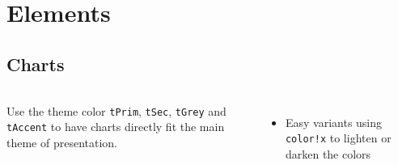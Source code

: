 \documentclass[aspectratio=169]{beamer}
\begin{document}
\section{Elements}
\subsection{Charts}
\begin{frame}{\insertsectionhead}
  \framesubtitle{\insertsubsectionhead}
  \begin{columns}[c, onlytextwidth]
    Use the theme color \texttt{tPrim}, \texttt{tSec}, \texttt{tGrey} and
    \texttt{tAccent} to have charts directly fit the main theme of presentation.
    \vfill
    \begin{itemize}
      \item Easy variants using \texttt{color!x} to lighten or darken the colors
    \end{itemize}
    \hfill
    \center
  \end{columns}
\end{frame}
\end{document}
